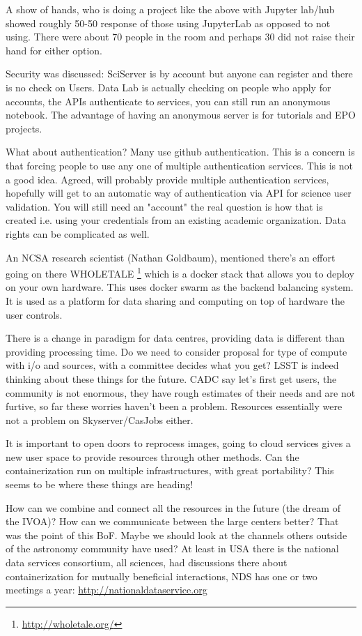 \documentclass[11pt,twoside]{article}
\begin{document}
A show of hands, who is doing a project like the above with Jupyter lab/hub showed roughly 50-50 response of those using JupyterLab as opposed to not using. There were about 70 people in the room and perhaps 30 did not raise their hand for either option.

Security was discussed:
SciServer is by account but anyone can register and there is no check on Users.
Data Lab  is actually checking on people who apply for accounts, the APIs authenticate to services, you can still run an anonymous notebook. The advantage of having an anonymous server is for tutorials and EPO projects.

What about authentication? Many use github authentication. This is a concern is that forcing people to use any one of multiple authentication services. This is not a good idea.
Agreed, will probably provide multiple authentication services, hopefully will get to an automatic way of authentication via API for science user validation. You will still need an "account" the real question is how that is created i.e. using your credentials from an existing academic organization.  Data rights can be complicated as well.


An NCSA research scientist (Nathan Goldbaum), mentioned there's an effort going on there WHOLETALE \footnote{\url{http://wholetale.org/}}  which is a docker stack that allows you to deploy on your own hardware. This uses docker swarm as the backend balancing system. It is used as a platform for data sharing and computing on top of hardware the user controls.

There is a change in paradigm for data centres, providing data is different than providing processing time. Do we need to consider proposal for type of compute with i/o and sources, with a committee  decides what you get?
	 LSST is indeed thinking about these things for the future.
	 CADC say let's first get users, the community is not enormous, they have rough estimates of their needs and are not furtive, so far these worries haven't been a problem. Resources essentially were not a problem on Skyserver/CasJobs either.

It is important to open doors to reprocess images, going to cloud services gives a new user space to provide resources through other methods. Can the containerization run on multiple infrastructures, with great portability?
This seems to be where these things are heading!


How can we combine and connect all the resources in the future (the dream of the IVOA)?
How can we communicate between the large centers better?
That was the point of this BoF.
Maybe we should look at the channels others outside of the astronomy community have used?
At least in USA there is the  national data services consortium, all sciences, had discussions there about containerization for mutually beneficial interactions, NDS has one or two meetings a year: \url{http://nationaldataservice.org}
\end{document}

